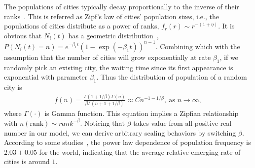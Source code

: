 \documentclass[reprint,unsortedaddress,amsmath,amssymb,aps,prl,showkeys]{revtex4-2}
\begin{document}
The populations of cities typically decay proportionally to the inverse of their ranks~\cite{gabaix1999zipf's}. This is referred as Zipf's law of cities' population sizes, i.e., the populations of cities distribute as a power of ranks, $f_r(r)\sim r^{-(1+\eta)}$. It is obvious that $N_i(t)$ has a geometric distribution~\cite{durrett1999essentials}, $P(N_i(t)=n)=e^{-\beta_1t}(1-\exp(- {\beta_1} t))^{n-1}$. Combining which with the assumption that the number of cities will grow exponentially at rate $\beta_1$, if we randomly pick an existing city, the waiting time since its first appearance is exponential with parameter $\beta_1$. Thus the distribution of population of a random city is 
\begin{align}
	f(n)=\frac{\Gamma(1+1/\beta)\Gamma(n)}{\beta\Gamma(n+1+1/\beta)}\approx Cn^{-1-1/\beta}, \ \text{as } n\to\infty,
\end{align}
where $\Gamma(\cdot)$ is Gamma function. This equation implies a Zipfian relationship with $n(\text{rank})\sim {rank}^{-\beta}$. Noticing that $\beta$ takes value from all positive real number in our model, we can derive arbitrary scaling behaviors by switching $\beta$. According to some studies~\cite{PhysRevLett.79.523}, the power law dependence of population frequency is $2.03\pm 0.05$ for the world, indicating that the average relative emerging rate of cities is around $1$. 
\end{document}
